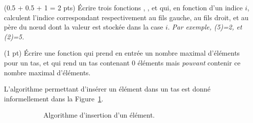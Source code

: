 \question (0.5 + 0.5 + 1 = 2 pts) {\'E}crire trois fonctions
, , et  qui, en
fonction d'un indice $i$, calculent l'indice correspondant
respectivement au fils gauche, au fils droit, et au p{\`e}re du n\oe ud
dont la valeur est stock{\'e}e dans la case $i$. \emph{Par exemple,
  (5)=2, et (2)=5.}

\question (1 pt) {\'E}crire une fonction qui prend en entr{\'e}e un nombre
maximal d'{\'e}l{\'e}ments pour un tas, et qui rend un tas contenant $0$
{\'e}l{\'e}ments mais \emph{pouvant} contenir ce nombre maximal d'{\'e}l{\'e}ments.

L'algorithme permettant d'ins{\'e}rer un {\'e}l{\'e}ment dans un tas est donn{\'e}
informellement dans la Figure~\ref{fig:tas:insertion}.
\begin{figure}
  \begin{subfigure}[t]{0.45\textwidth}
    \centering
    \caption{Algorithme d'insertion d'un {\'e}l{\'e}ment.}
    \label{fig:tas:insertion}
  \end{subfigure}
  \qquad
  \begin{subfigure}[t]{0.45\textwidth}
    \centering
\end{subfigure}
\end{figure}

